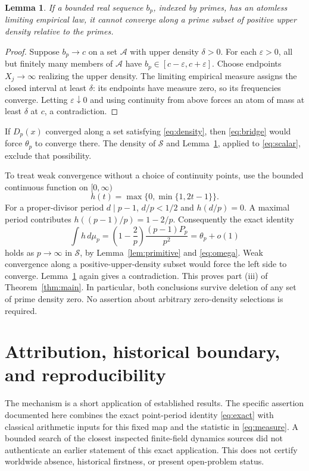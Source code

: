 \documentclass[11pt]{article}
\newtheorem{lemma}[theorem]{Lemma}
\theoremstyle{remark}
\begin{document}
\begin{lemma}\label{lem:atom}
If a bounded real sequence $b_p$, indexed by primes, has an atomless
limiting empirical law, it cannot converge along a prime subset of
positive upper density relative to the primes.
\end{lemma}
\begin{proof}
Suppose $b_p\to c$ on a set $\mathcal A$ with upper density $\delta>0$.
For each $\varepsilon>0$, all but finitely many members of
$\mathcal A$ have $b_p\in[c-\varepsilon,c+\varepsilon]$.
Choose endpoints $X_j\to\infty$ realizing the upper density.
The limiting empirical measure assigns the closed interval at least
$\delta$: its endpoints have measure zero, so its frequencies converge.
Letting $\varepsilon\downarrow0$ and using continuity from above forces
an atom of mass at least $\delta$ at $c$, a contradiction.
\end{proof}

If $D_p(x)$ converged along a set satisfying \eqref{eq:density}, then
\eqref{eq:bridge} would force $\theta_p$ to converge there. The density
of $\mathcal S$ and Lemma~\ref{lem:atom}, applied to \eqref{eq:scalar},
exclude that possibility.

To treat weak convergence without a choice of continuity points, use
the bounded continuous function on $[0,\infty)$
\[
 h(t)=\max\{0,\min\{1,2t-1\}\}.
\]
For a proper-divisor period $d\mid p-1$, $d/p<1/2$ and $h(d/p)=0$.
A maximal period contributes $h((p-1)/p)=1-2/p$. Consequently the
exact identity
\begin{equation}\label{eq:moment}
 \int h\,d\mu_p
 =\left(1-\frac2p\right)\frac{(p-1)P_p}{p^2}
 =\theta_p+o(1)
\end{equation}
holds as $p\to\infty$ in $\mathcal S$, by
Lemma~\ref{lem:primitive} and \eqref{eq:omega}.
Weak convergence along a positive-upper-density subset would force
the left side to converge. Lemma~\ref{lem:atom} again gives a
contradiction. This proves part (iii) of Theorem~\ref{thm:main}.
In particular, both conclusions survive deletion of any set of prime
density zero. No assertion about arbitrary zero-density selections
is required.

\section{Attribution, historical boundary, and reproducibility}
The mechanism is a short application of established results. The
specific assertion documented here combines the exact point-period
identity \eqref{eq:exact} with classical arithmetic inputs for this
fixed map and the statistic in \eqref{eq:measure}. A bounded search
of the closest inspected finite-field dynamics sources did not
authenticate an earlier statement of this exact application. This
does not certify worldwide absence, historical firstness, or present
open-problem status.
\end{document}
